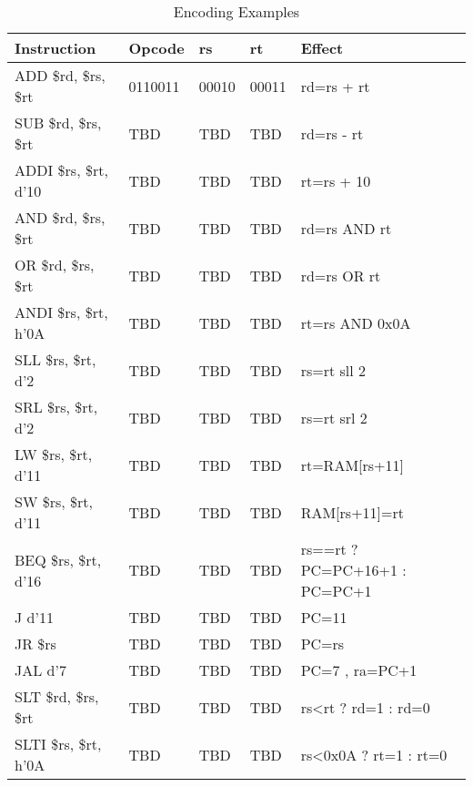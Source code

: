 \documentclass[a4paper,11pt]{article}
\begin{document}
	\begin{table}[h!]
		\centering
		\begin{tabular}{|l|l|l|l|l|}
			\hline
			\textbf{Instruction} & \textbf{Opcode} & \textbf{rs} & \textbf{rt} & \textbf{Effect}\\
			\hline
			ADD \$rd, \$rs, \$rt       & 0110011         & 00010         & 00011         & rd=rs + rt \\
			\hline
			SUB \$rd, \$rs, \$rt       & TBD         & TBD         & TBD          & rd=rs - rt\\
			\hline
			ADDI \$rs, \$rt, d'10       & TBD         & TBD         & TBD          & rt=rs + 10 \\
			\hline
			AND \$rd, \$rs, \$rt       & TBD         & TBD         & TBD          & rd=rs AND rt \\
			\hline
			OR \$rd, \$rs, \$rt       & TBD         & TBD         & TBD          & rd=rs OR rt \\
			\hline
			ANDI \$rs, \$rt, h'0A       & TBD         & TBD         & TBD          & rt=rs AND 0x0A \\
			\hline
			SLL \$rs, \$rt, d'2       & TBD         & TBD         & TBD          & rs=rt sll 2 \\
			\hline
			SRL \$rs, \$rt, d'2       & TBD         & TBD         & TBD          & rs=rt srl 2 \\
			\hline
			LW \$rs, \$rt, d'11       & TBD         & TBD         & TBD          & rt=RAM[rs+11] \\
			\hline
			SW \$rs, \$rt, d'11       & TBD         & TBD         & TBD          & RAM[rs+11]=rt \\
			\hline
			BEQ \$rs, \$rt, d'16       & TBD         & TBD         & TBD          & rs==rt ? PC=PC+16+1 : PC=PC+1 \\
			\hline
			J d'11       & TBD         & TBD         & TBD          & PC=11 \\
			\hline
			JR \$rs       & TBD         & TBD         & TBD          & PC=rs \\
			\hline
			JAL d'7       & TBD         & TBD         & TBD          & PC=7 , ra=PC+1 \\
			\hline
			SLT \$rd, \$rs, \$rt       & TBD         & TBD         & TBD          & rs<rt ? rd=1 : rd=0 \\
			\hline
			SLTI \$rs, \$rt, h'0A       & TBD         & TBD         & TBD          & rs<0x0A ? rt=1 : rt=0 \\
			\hline
			
		
			
		\end{tabular}
		\caption{Encoding Examples}
		\label{tab:encoding_examples}
	\end{table}
	
\end{document}
